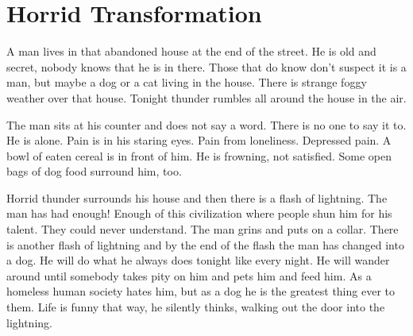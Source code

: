 \chapter{Horrid Transformation}


A man lives in that abandoned house at the end of the street. He is
old and secret, nobody knows that he is in there. Those that do
know don't suspect it is a man, but maybe a dog or a cat living in
the house. There is strange foggy weather over that house. Tonight
thunder rumbles all around the house in the air.



The man sits at his counter and does not say a word. There is no
one to say it to. He is alone. Pain is in his staring eyes. Pain
from loneliness. Depressed pain. A bowl of eaten cereal is in front
of him. He is frowning, not satisfied. Some open bags of dog food
surround him, too.



Horrid thunder surrounds his house and then there is a flash of
lightning. The man has had enough! Enough of this civilization
where people shun him for his talent. They could never understand.
The man grins and puts on a collar. There is another flash of
lightning and by the end of the flash the man has changed into a
dog. He will do what he always does tonight like every night. He
will wander around until somebody takes pity on him and pets him
and feed him. As a homeless human society hates him, but as a dog
he is the greatest thing ever to them. Life is funny that way, he
silently thinks, walking out the door into the lightning. 

 





